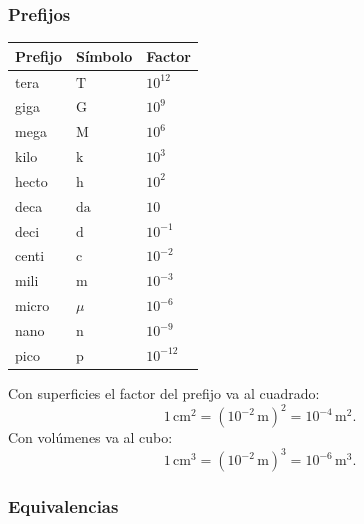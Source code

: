 \subsubsection*{Prefijos}

\begin{center}
\begin{tabular}{lll}
\hline
Prefijo & Símbolo & Factor \\
\hline
tera & $\mathrm{T}$ & $10^{12}$ \\
giga & $\mathrm{G}$ & $10^9$ \\
mega & $\mathrm{M}$ & $10^6$ \\
kilo & $\mathrm{k}$ & $10^3$ \\
hecto & $\mathrm{h}$ & $10^2$ \\
deca & $\mathrm{da}$ & $10$ \\
deci & $\mathrm{d}$ & $10^{-1}$ \\
centi & $\mathrm{c}$ & $10^{-2}$ \\
mili & $\mathrm{m}$ & $10^{-3}$ \\
micro & $\mu$ & $10^{-6}$ \\
nano & $\mathrm{n}$ & $10^{-9}$ \\
pico & $\mathrm{p}$ & $10^{-12}$ \\
\hline
\end{tabular}
\end{center}

Con superficies el factor del prefijo va al cuadrado:
\[
1\,\mathrm{cm^2}=(10^{-2}\,\mathrm{m})^2
=10^{-4}\,\mathrm{m^2}.
\]
Con volúmenes va al cubo:
\[
1\,\mathrm{cm^3}=(10^{-2}\,\mathrm{m})^3
=10^{-6}\,\mathrm{m^3}.
\]

\subsubsection*{Equivalencias}

